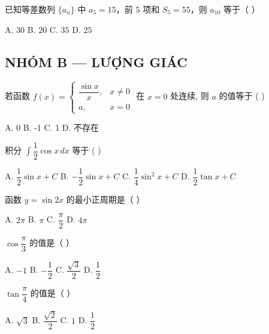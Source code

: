 \documentclass[11pt, a4paper]{article}
\begin{document}
\begin{baitap}[13]
已知等差数列 $\{a_n\}$ 中 $a_5 = 15$，前 $5$ 项和 $S_5 = 55$，则 $a_{10}$ 等于（ ）
\par\vspace{3pt}
\noindent A. $30$ \quad B. $20$ \quad C. $35$ \quad D. $25$
\end{baitap}

\subsection*{NHÓM B — LƯỢNG GIÁC}

\begin{baitap}[14]
若函数 $f(x) = \begin{cases} \dfrac{\sin x}{x}, & x \ne 0 \\ a, & x = 0 \end{cases}$ 在 $x = 0$ 处连续, 则 $a$ 的值等于 ( )
\par\vspace{3pt}
\noindent A. 0 \quad B. -1 \quad C. 1 \quad D. 不存在
\end{baitap}

\begin{baitap}[15]
积分 $\int \dfrac{1}{2}\cos x\,dx$ 等于 ( )
\par\vspace{3pt}
\noindent A. $\dfrac{1}{2}\sin x + C$ \quad B. $-\dfrac{1}{2}\sin x + C$ \quad C. $\dfrac{1}{4}\sin^2x + C$ \quad D. $\dfrac{1}{2}\tan x + C$
\end{baitap}

\begin{baitap}[16]
函数 $y = \sin 2x$ 的最小正周期是（ ）
\par\vspace{3pt}
\noindent A. $2\pi$ \quad B. $\pi$ \quad C. $\dfrac{\pi}{2}$ \quad D. $4\pi$
\end{baitap}

\begin{baitap}[17]
$\cos\dfrac{\pi}{3}$ 的值是（ ）
\par\vspace{3pt}
\noindent A. $-1$ \quad B. $-\dfrac{1}{2}$ \quad C. $\dfrac{\sqrt{3}}{2}$ \quad D. $\dfrac{1}{2}$
\end{baitap}

\begin{baitap}[18]
$\tan\dfrac{\pi}{4}$ 的值是（ ）
\par\vspace{3pt}
\noindent A. $\sqrt{3}$ \quad B. $\dfrac{\sqrt{2}}{2}$ \quad C. $1$ \quad D. $\dfrac{1}{2}$
\end{baitap}
\end{document}
